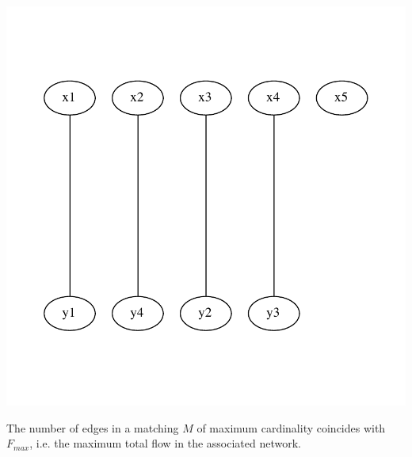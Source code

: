 \begin{example*}
\includegraphics[scale=0.7]{diagrams/Chapter4_Example12.pdf}\\
\end{example*}
\begin{theorem}
The number of edges in a matching $M$ of maximum cardinality coincides with $F_{max}$, i.e. the
 maximum total flow in the associated network.
\end{theorem}
